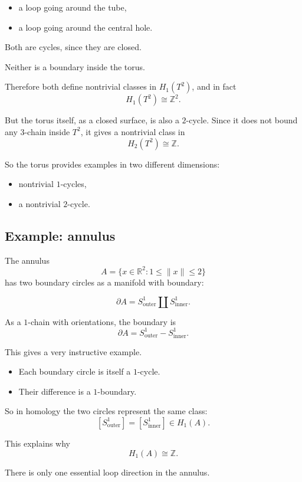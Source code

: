 \documentclass[12pt,a4paper]{article}
\theoremstyle{notespace}
\begin{document}
\begin{itemize}
	\item a loop going around the tube,
	\item a loop going around the central hole.
\end{itemize}

Both are cycles, since they are closed.

Neither is a boundary inside the torus.

Therefore both define nontrivial classes in \(H_1(T^2)\), and in fact
\[
H_1(T^2)\cong \mathbb Z^2.
\]

But the torus itself, as a closed surface, is also a \(2\)-cycle. Since it does not bound any \(3\)-chain inside \(T^2\), it gives a nontrivial class in
\[
H_2(T^2)\cong \mathbb Z.
\]

So the torus provides examples in two different dimensions:

\begin{itemize}
	\item nontrivial \(1\)-cycles,
	\item a nontrivial \(2\)-cycle.
\end{itemize}

\subsection{ Example: annulus}

The annulus
\[
A=\{x\in \mathbb R^2 : 1\leq \|x\|\leq 2\}
\]
has two boundary circles as a manifold with boundary:

\[
\partial A = S^1_{\text{outer}} \amalg S^1_{\text{inner}}.
\]

As a \(1\)-chain with orientations, the boundary is
\[
\partial A = S^1_{\text{outer}} - S^1_{\text{inner}}.
\]

This gives a very instructive example.

\begin{itemize}
	\item Each boundary circle is itself a \(1\)-cycle.
	\item Their difference is a \(1\)-boundary.
\end{itemize}

So in homology the two circles represent the same class:
\[
[S^1_{\text{outer}}]=[S^1_{\text{inner}}]\in H_1(A).
\]

This explains why
\[
H_1(A)\cong \mathbb Z.
\]

There is only one essential loop direction in the annulus.
\end{document}
